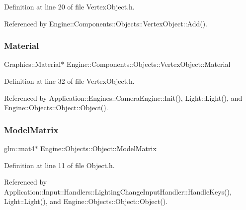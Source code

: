 Definition at line 20 of file Vertex\+Object.\+h.



Referenced by Engine\+::\+Components\+::\+Objects\+::\+Vertex\+Object\+::\+Add().

\mbox{\label{classEngine_1_1Components_1_1Objects_1_1VertexObject_a86c1fced4cdc5e59a66a635390a17eca}} 
\subsubsection{\texorpdfstring{Material}{Material}}
{\footnotesize\ttfamily Graphics\+::\+Material$\ast$ Engine\+::\+Components\+::\+Objects\+::\+Vertex\+Object\+::\+Material\hspace{0.3cm}{\ttfamily [inherited]}}



Definition at line 32 of file Vertex\+Object.\+h.



Referenced by Application\+::\+Engines\+::\+Camera\+Engine\+::\+Init(), Light\+::\+Light(), and Engine\+::\+Objects\+::\+Object\+::\+Object().

\mbox{\label{classEngine_1_1Objects_1_1Object_acf41cc091fa270053245ed26bc28c8a4}} 
\subsubsection{\texorpdfstring{Model\+Matrix}{ModelMatrix}}
{\footnotesize\ttfamily glm\+::mat4$\ast$ Engine\+::\+Objects\+::\+Object\+::\+Model\+Matrix\hspace{0.3cm}{\ttfamily [inherited]}}



Definition at line 11 of file Object.\+h.



Referenced by Application\+::\+Input\+::\+Handlers\+::\+Lighting\+Change\+Input\+Handler\+::\+Handle\+Keys(), Light\+::\+Light(), and Engine\+::\+Objects\+::\+Object\+::\+Object().

